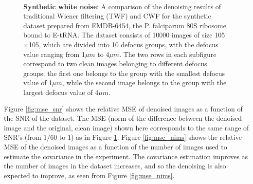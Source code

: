 \begin{figure}[]
\centering
{}
\quad
{}\\
\quad
{}
\caption{\textbf{Synthetic white noise}: A comparison of the denoising results of 
traditional Wiener filtering (TWF) and CWF for the 
synthetic dataset prepared from EMDB-6454, the P. falciparum 80S ribosome bound 
to E-tRNA. The dataset consists of 10000 images
of size 105$\times$105, which are divided into 10 defocus groups, with the 
defocus value ranging from 1$\mu m$ to 4$\mu m$. The two rows in each subfigure 
correspond to two clean
images belonging to different defocus groups;
the first one
belongs to the group with the smallest defocus value of 1$\mu m$, 
while the second image belongs to the group with the
largest defocus value of 4$\mu m$.  
}
\label{fig:ims_6454}
\end{figure}

Figure \ref{fig:mse_snr} shows the relative MSE of denoised images as a function
of the SNR of the dataset. The MSE (norm of the difference between the denoised image and the original, clean image) shown here
corresponds to the same range of SNR's (from $1/60$ to $1$) as in Figure 
\ref{fig:ims_6454}. Figure \ref{fig:mse_nims} shows the relative MSE of the 
denoised images as a 
function of the number of images used to estimate the covariance in the experiment.
The covariance estimation improves as the number of images in the 
dataset increases, and so the denoising is also expected
to improve, as seen from Figure \ref{fig:mse_nims}.

